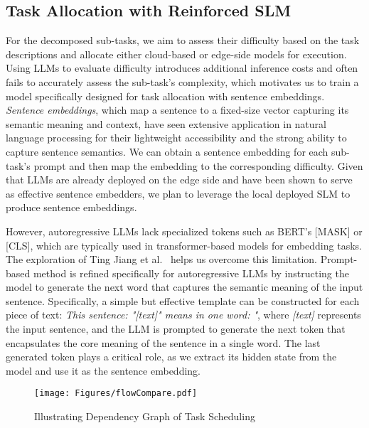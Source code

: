 \subsection{Task Allocation with Reinforced SLM}
\label{method:allocation}


For the decomposed sub-tasks, we aim to assess their difficulty based on the task descriptions and allocate either cloud-based or edge-side models for execution. Using LLMs to evaluate difficulty introduces additional inference costs and often fails to accurately assess the sub-task’s complexity, which motivates us to train a model specifically designed for task allocation with sentence embeddings.
\textit{Sentence embeddings}, which map a sentence to a fixed-size vector capturing its semantic meaning and context, have seen extensive application in natural language processing for their lightweight accessibility and the strong ability to capture sentence semantics. We can obtain a sentence embedding for each sub-task's prompt and then map the embedding to the corresponding difficulty. Given that LLMs are already deployed on the edge side and have been shown to serve as effective sentence embedders, we plan to leverage the local deployed SLM to produce sentence embeddings.

However, autoregressive LLMs lack specialized tokens such as BERT’s [MASK] or [CLS], which are typically used in transformer-based models for embedding tasks. The exploration of Ting Jiang et al.~\cite{jiang2023scaling} helps us overcome this limitation. 
Prompt-based method is refined specifically for autoregressive LLMs by instructing the model to generate the next word that captures the semantic meaning of the input sentence. Specifically, a simple but effective template can be constructed for each piece of text: \textit{This sentence: "[text]" means in one word: "}, where \textit{[text]} represents the input sentence, and the LLM is prompted to generate the next token that encapsulates the core meaning of the sentence in a single word. The last generated token plays a critical role, as we extract its hidden state from the model and use it as the sentence embedding.


\begin{figure}
    \centering
    \texttt{[image: Figures/flowCompare.pdf]}
    \vspace{-3mm}
    \caption{Illustrating Dependency Graph of Task Scheduling}
    \label{method:flow-Compare}
    \vspace{-5mm}
\end{figure}

